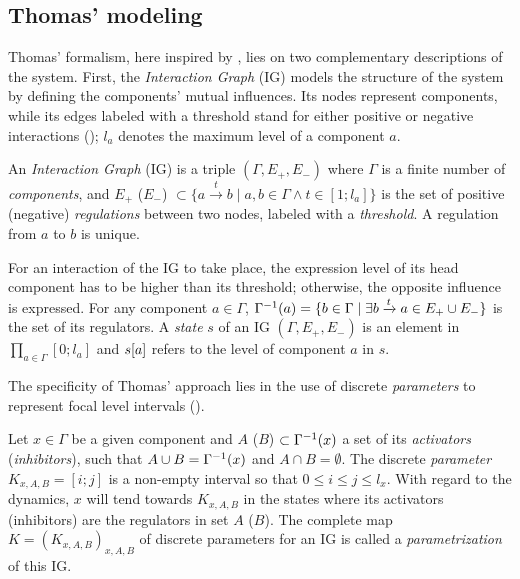 \subsection{Thomas' modeling}
Thomas' formalism, here inspired by \cite{Richard06,BernotSemBRN}, lies on two complementary descriptions of the system.
First, the \emph{Interaction Graph} (IG) models the structure of the system by defining the components' mutual influences.
Its nodes represent components, while its edges labeled with a threshold stand for either positive or negative interactions ();
$l_a$ denotes the maximum level of a component $a$.

\begin{definition}
\label{def:ig}
An \emph{Interaction Graph} (IG) is a triple $(\Gamma, E_+, E_-)$ where $\Gamma$ is a finite number of \emph{components},
and $E_+$ (\resp $E_-$) $\subset \{a \xrightarrow{t} b \mid a, b \in \Gamma \wedge t \in [1; l_a]\}$
is the set of positive (\resp negative) \emph{regulations} between two nodes, labeled with a \emph{threshold}.
A regulation from $a$ to $b$ is unique.
\end{definition}

\noindent
For an interaction of the IG to take place, the expression level of its head component has to be higher than its threshold; otherwise, the opposite influence is expressed.
For any component $a \in \Gamma$, $\Gamma^{-1}(a) = \{ b\in\Gamma\mid \exists b\xrightarrow t a\in E_+\cup E_- \}$
is the set of its regulators.
A \emph{state} $s$ of an IG $(\Gamma, E_+, E_-)$ is an element in $\prod_{a \in \Gamma} [0;l_a]$
and ${s[a]}$ refers to the level of component $a$ in $s$.

The specificity of Thomas' approach lies in the use of discrete \emph{parameters} to represent focal level intervals ().

\begin{definition}\label{def:param}
Let $x \in \Gamma$ be a given component and $A$ (\resp $B$) $\subset \Gamma^{-1}(x)$ a set of its \emph{activators} (\resp \emph{inhibitors}),
such that $A \cup B = \Gamma^{-1}(x)$ and $A \cap B = \emptyset$.
The discrete \emph{parameter} $K_{x,A,B} = [i; j]$ is a non-empty interval so that $0 \leq i \leq j \leq l_x$.
With regard to the dynamics, $x$ will tend towards $K_{x,A,B}$ in the states where its activators (\resp inhibitors) are the regulators in set $A$ (\resp $B$).
The complete map $K = (K_{x,A,B})_{x,A,B}$ of discrete parameters for an IG is called a \emph{parametrization} of this IG.
\end{definition}

